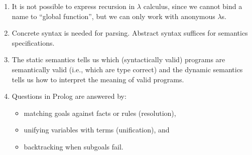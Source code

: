 \begin{enumerate}
\item It is not possible to express recursion in $\lambda$ calculus, since we cannot bind a name to ``global function'', but we can only work with anonymous $\lambda$s.
\item Concrete syntax is needed for parsing. Abstract syntax suffices for semantics specifications.
\item The static semantics tells us which (syntactically valid) programs are semantically valid (i.e., which are type correct) and the dynamic semantics tells us how to interpret the meaning of valid programs.
\item Questions in Prolog are answered by: 
	\begin{itemize}
	\item matching goals against facts or rules (resolution), 
	\item unifying variables with terms (unification), and
	\item backtracking when subgoals fail.
	\end{itemize}
\end{enumerate}

